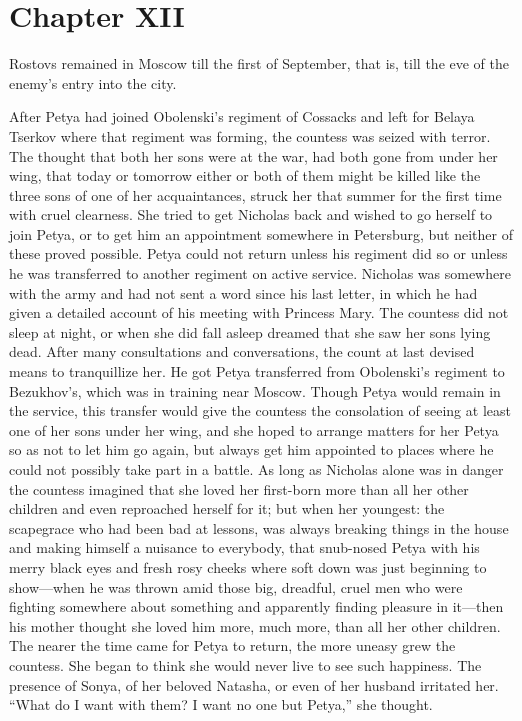 \chapter*{Chapter XII} \ifaudio {}
\fi

 Rostovs remained in Moscow till the first of September, that
is, till the eve of the enemy's entry into the city.

After Petya had joined Obolenski's regiment of Cossacks and left
for Belaya Tserkov where that regiment was forming, the countess
was seized with terror. The thought that both her sons were at
the war, had both gone from under her wing, that today or
tomorrow either or both of them might be killed like the three
sons of one of her acquaintances, struck her that summer for the
first time with cruel clearness. She tried to get Nicholas back
and wished to go herself to join Petya, or to get him an
appointment somewhere in Petersburg, but neither of these proved
possible. Petya could not return unless his regiment did so or
unless he was transferred to another regiment on active
service. Nicholas was somewhere with the army and had not sent a
word since his last letter, in which he had given a detailed
account of his meeting with Princess Mary. The countess did not
sleep at night, or when she did fall asleep dreamed that she saw
her sons lying dead. After many consultations and conversations,
the count at last devised means to tranquillize her. He got Petya
transferred from Obolenski's regiment to Bezukhov's, which was in
training near Moscow. Though Petya would remain in the service,
this transfer would give the countess the consolation of seeing
at least one of her sons under her wing, and she hoped to arrange
matters for her Petya so as not to let him go again, but always
get him appointed to places where he could not possibly take part
in a battle. As long as Nicholas alone was in danger the countess
imagined that she loved her first-born more than all her other
children and even reproached herself for it; but when her
youngest: the scapegrace who had been bad at lessons, was always
breaking things in the house and making himself a nuisance to
everybody, that snub-nosed Petya with his merry black eyes and
fresh rosy cheeks where soft down was just beginning to
show---when he was thrown amid those big, dreadful, cruel men who
were fighting somewhere about something and apparently finding
pleasure in it---then his mother thought she loved him more, much
more, than all her other children. The nearer the time came for
Petya to return, the more uneasy grew the countess. She began to
think she would never live to see such happiness. The presence of
Sonya, of her beloved Natasha, or even of her husband irritated
her. ``What do I want with them? I want no one but Petya,'' she
thought.


